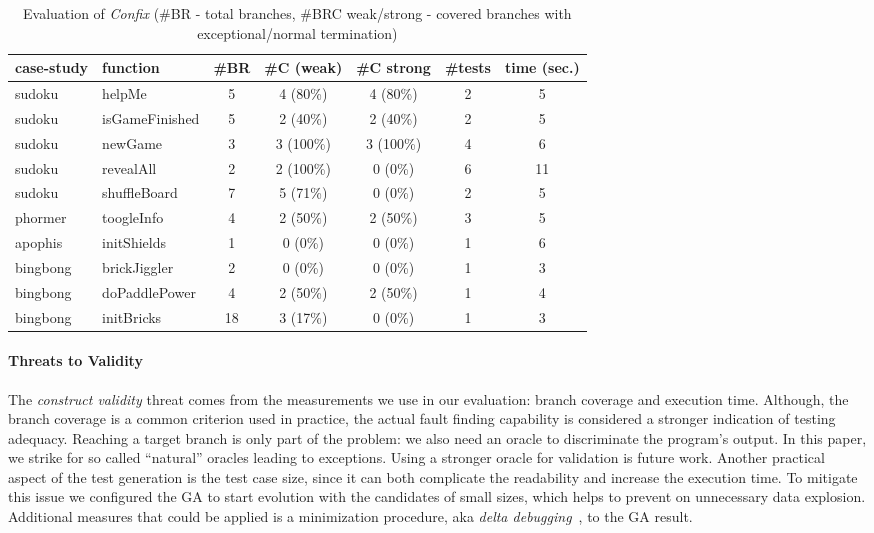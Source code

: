 \documentclass[sigconf,review]{acmart}
\begin{document}
 
\begin{table}[!t]
  \caption{Evaluation of \emph{Confix} (\#BR - total branches, \#BRC weak/strong - covered branches with exceptional/normal termination)}
  \label{tbl.confix.compare}
    \footnotesize
    \centering
    \begin{tabular}{l|l|c|c|c|c|c}
      \toprule
      \textbf{case-study} & \textbf{function} & \textbf{\#BR} & \textbf{\#C (weak)} & \textbf{\#C strong} & \textbf{\#tests} & \textbf{time (sec.)} \\
      \hline
      sudoku & helpMe          & 5  & 4 (80\%)  & 4 (80\%)  & 2 & 5 \\
      sudoku & isGameFinished  & 5  & 2 (40\%)  & 2 (40\%)  & 2 & 5 \\
      sudoku & newGame         & 3  & 3 (100\%) & 3 (100\%) & 4 & 6 \\
      sudoku & revealAll       & 2  & 2 (100\%) & 0 (0\%)   & 6 & 11 \\
      sudoku & shuffleBoard    & 7  & 5 (71\%)  & 0 (0\%)   & 2 & 5  \\
      \hline
      phormer & toogleInfo     & 4  & 2 (50\%)  & 2 (50\%)  & 3 & 5 \\
      \hline
      apophis & initShields    & 1  & 0 (0\%)   & 0 (0\%)   & 1 & 6 \\
      \hline
      bingbong & brickJiggler  & 2  & 0 (0\%)   & 0 (0\%)   & 1  & 3 \\
      bingbong & doPaddlePower & 4  & 2 (50\%)  & 2 (50\%)  & 1  & 4 \\
      bingbong & initBricks    & 18 & 3 (17\%)  & 0 (0\%) & 1  & 3 \\
      \bottomrule
    \end{tabular}
\end{table}


\paragraph{\textbf{Threats to Validity}}
The \emph{construct validity} threat comes from the measurements we use in our evaluation: branch coverage and execution time. Although, the branch coverage is a common criterion used in practice, the actual fault finding capability is considered a stronger indication of testing adequacy. Reaching a target branch is only part of the problem: we also need an oracle to discriminate the program's output. In this paper, we strike for so called ``natural'' oracles leading to exceptions. Using a stronger oracle for validation is future work. Another practical aspect of the test generation is the test case size, since it can both complicate the readability and increase the execution time. To mitigate this issue we configured the GA to start evolution with the candidates of small sizes, which helps to prevent on unnecessary data explosion. Additional measures that could be applied is a minimization procedure, aka \emph{delta debugging}~\cite{misherghi2006hdd}, to the GA result.
\end{document}

